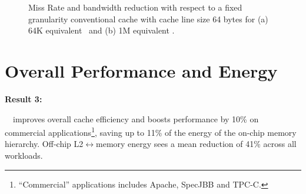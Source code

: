 {\begin{figure}[!h]
  \caption[Miss Rate and Bandwidth Improvement]{Miss Rate and bandwidth reduction with respect to a fixed granularity conventional cache with cache line size 64 bytes for (a) 64K equivalent \AC\ and (b) 1M equivalent \AC{}.}
  \label{fig:miss_bw_reduction}
\end{figure}

\section{Overall Performance and Energy}
\label{sec:overall_performance_and_energy}
\noindent \textbf{Result 3:}{~\AC\ improves overall cache efficiency and boosts performance by 10\% on commercial applications\footnote{``Commercial'' applications includes Apache, SpecJBB and TPC-C.}, saving up to 11\% of the energy of the on-chip memory hierarchy. Off-chip L2$\leftrightarrow$memory energy sees a mean reduction of 41\% across all workloads. 

\begin{figure}[!h]
  \centering
    

\end{figure}}}
